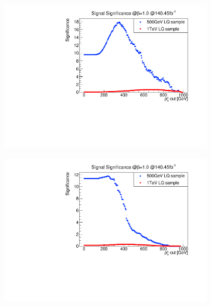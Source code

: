 \begin{figure}
  \centering
                \begin{subfigure}[t]{0.49\textwidth}
                \includegraphics[width=\textwidth]{figures/plots/Significance/xcut_pt_2b-jet_1tau.pdf}
                \label{xcut:pt:2b1tau}
                \end{subfigure}
                \begin{subfigure}[t]{0.49\textwidth}
                \includegraphics[width=\textwidth]{figures/plots/Significance/xcut_pt_2b-jet_2tau.pdf}
                \label{xcut:pt:2b2tau}

\end{subfigure}
\end{figure}
